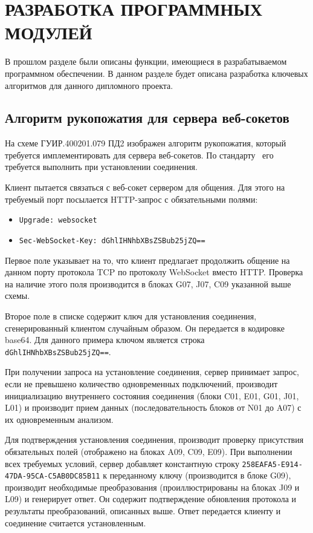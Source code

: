 \pagebreak
\section{РАЗРАБОТКА ПРОГРАММНЫХ МОДУЛЕЙ}
\label{sec:dev}

\def\websockHandshakeScheme{ГУИР.400201.079 ПД2}

В прошлом разделе были описаны функции, имеющиеся в разрабатываемом программном обеспечении. 
В данном разделе будет описана разработка ключевых алгоритмов для данного дипломного проекта.

\subsection{Алгоритм рукопожатия для сервера веб-сокетов}

На схеме \websockHandshakeScheme{} изображен алгоритм рукопожатия, который
требуется имплементировать для сервера веб-сокетов. По стандарту~\cite{websock_rfc}
его требуется выполнить при установлении соединения.

Клиент пытается связаться с веб-сокет сервером для общения. Для этого на
требуемый порт посылается HTTP-запрос с обязательными полями:
\begin{itemize}
    \item \texttt{Upgrade: websocket}
    \item \texttt{Sec-WebSocket-Key: dGhlIHNhbXBsZSBub25jZQ==}
\end{itemize}

Первое поле указывает на то, что клиент предлагает продолжить общение
на данном порту протокола TCP по протоколу WebSocket вместо HTTP.
Проверка на наличие этого поля производится в блоках G07, J07, C09 указанной выше
схемы.

Второе поле в списке содержит ключ для установления соединения, сгенерированный
клиентом случайным образом. Он передается в кодировке base64. Для данного примера
ключом является строка \texttt{dGhlIHNhbXBsZSBub25jZQ==}.

При получении запроса на установление соединения, сервер принимает запрос,
если не превышено количество одновременных подключений, производит инициализацию
внутреннего состояния соединения (блоки C01, E01, G01, J01, L01) и
производит прием данных (последовательность блоков от N01 до A07) с их
одновременным анализом.

Для подтверждения установления соединения, производит проверку присутствия
обязательных полей (отображено на блоках A09, C09, E09).
При выполнении всех требуемых условий, сервер добавляет константную строку
\texttt{258EAFA5-E914-47DA-95CA-C5AB0DC85B11} к переданному ключу (производится
в блоке G09), производит необходимые преобразования (проиллюстрированы на блоках
J09 и L09) и генерирует ответ. Он содержит подтверждение обновления протокола
и результаты преобразований, описанных выше. Ответ передается клиенту и соединение
считается установленным.

